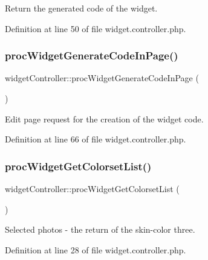 Return the generated code of the widget. 



Definition at line 50 of file widget.\+controller.\+php.

\hypertarget{classwidgetController_a0e6483bd8d30255e5cea027b46fc9288}{}\label{classwidgetController_a0e6483bd8d30255e5cea027b46fc9288} 
\subsubsection{\texorpdfstring{proc\+Widget\+Generate\+Code\+In\+Page()}{procWidgetGenerateCodeInPage()}}
{\footnotesize\ttfamily widget\+Controller\+::proc\+Widget\+Generate\+Code\+In\+Page (\begin{DoxyParamCaption}{ }\end{DoxyParamCaption})}



Edit page request for the creation of the widget code. 



Definition at line 66 of file widget.\+controller.\+php.

\hypertarget{classwidgetController_a1ea3fa6a1799d8d1190eeeba8424df04}{}\label{classwidgetController_a1ea3fa6a1799d8d1190eeeba8424df04} 
\subsubsection{\texorpdfstring{proc\+Widget\+Get\+Colorset\+List()}{procWidgetGetColorsetList()}}
{\footnotesize\ttfamily widget\+Controller\+::proc\+Widget\+Get\+Colorset\+List (\begin{DoxyParamCaption}{ }\end{DoxyParamCaption})}



Selected photos -\/ the return of the skin-\/color three. 



Definition at line 28 of file widget.\+controller.\+php.

\hypertarget{classwidgetController_a2704aca7d4721e2f48c87c47fd2f192b}{}\label{classwidgetController_a2704aca7d4721e2f48c87c47fd2f192b} 

